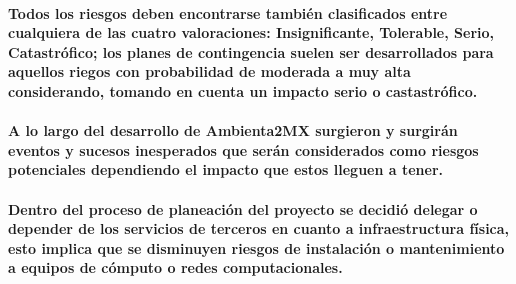     \paragraph{Todos los riesgos deben encontrarse también clasificados entre cualquiera de las cuatro valoraciones: Insignificante, Tolerable, Serio, Catastrófico; los planes de contingencia suelen ser desarrollados para aquellos riegos con probabilidad de moderada a muy alta considerando, tomando en cuenta un impacto serio o castastrófico.}
    \paragraph{A lo largo del desarrollo de Ambienta2MX surgieron y surgirán eventos y sucesos inesperados que serán considerados como riesgos potenciales dependiendo el impacto que estos lleguen a tener.}
    \paragraph{Dentro del proceso de planeación del proyecto se decidió delegar o depender de los servicios de terceros en cuanto a infraestructura física, esto implica que se disminuyen riesgos de instalación o mantenimiento a equipos de cómputo o redes computacionales.}
